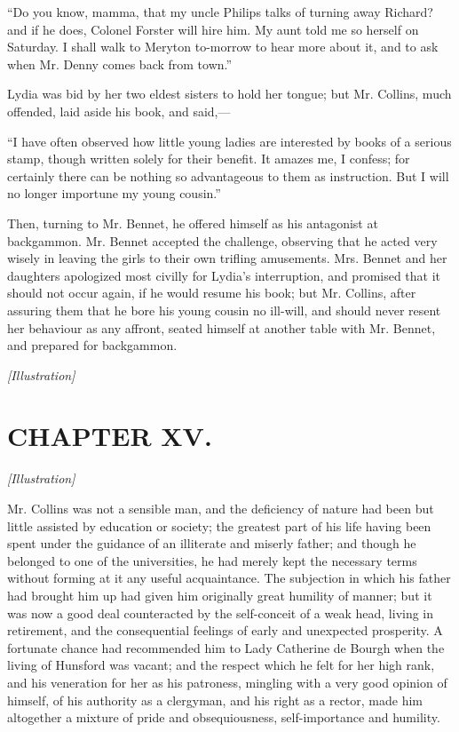 \documentclass[12pt]{book}
\begin{document}
``Do you know, mamma, that my uncle Philips talks of turning away Richard? and if he does, Colonel Forster will hire him. My aunt told me so herself on Saturday. I shall walk to Meryton to-morrow to hear more about it, and to ask when Mr. Denny comes back from town.''

Lydia was bid by her two eldest sisters to hold her tongue; but Mr. Collins, much offended, laid aside his book, and said,---

``I have often observed how little young ladies are interested by books of a serious stamp, though written solely for their benefit. It amazes me, I confess; for certainly there can be nothing so advantageous to them as instruction. But I will no longer importune my young cousin.''

Then, turning to Mr. Bennet, he offered himself as his antagonist at backgammon. Mr. Bennet accepted the challenge, observing that he acted very wisely in leaving the girls to their own trifling amusements. Mrs. Bennet and her daughters apologized most civilly for Lydia's interruption, and promised that it should not occur again, if he would resume his book; but Mr. Collins, after assuring them that he bore his young cousin no ill-will, and should never resent her behaviour as any affront, seated himself at another table with Mr. Bennet, and prepared for backgammon.

\emph{[Illustration]}

\chapter{CHAPTER XV.}

\emph{[Illustration]}

Mr. Collins was not a sensible man, and the deficiency of nature had been but little assisted by education or society; the greatest part of his life having been spent under the guidance of an illiterate and miserly father; and though he belonged to one of the universities, he had merely kept the necessary terms without forming at it any useful acquaintance. The subjection in which his father had brought him up had given him originally great humility of manner; but it was now a good deal counteracted by the self-conceit of a weak head, living in retirement, and the consequential feelings of early and unexpected prosperity. A fortunate chance had recommended him to Lady Catherine de Bourgh when the living of Hunsford was vacant; and the respect which he felt for her high rank, and his veneration for her as his patroness, mingling with a very good opinion of himself, of his authority as a clergyman, and his right as a rector, made him altogether a mixture of pride and obsequiousness, self-importance and humility.
\end{document}

